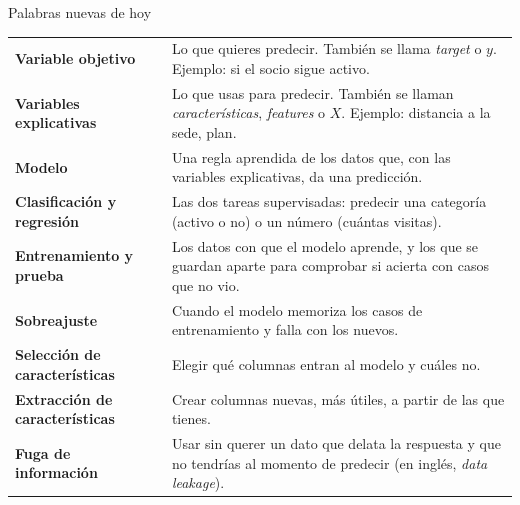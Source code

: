 \documentclass[aspectratio=169,11pt]{beamer}
\begin{document}
\begin{frame}[t]{Palabras nuevas de hoy}
  \footnotesize
  \renewcommand{\arraystretch}{1.1}
  \begin{tabular}{@{}L{3.6cm}L{9.9cm}@{}}
    \toprule
    \textbf{Variable objetivo} & Lo que quieres predecir. También se llama \textit{target} o $y$. Ejemplo: si el socio sigue activo. \\
    \textbf{Variables explicativas} & Lo que usas para predecir. También se llaman \textit{características}, \textit{features} o $X$. Ejemplo: distancia a la sede, plan. \\
    \textbf{Modelo} & Una regla aprendida de los datos que, con las variables explicativas, da una predicción. \\
    \textbf{Clasificación y regresión} & Las dos tareas supervisadas: predecir una categoría (activo o no) o un número (cuántas visitas). \\
    \textbf{Entrenamiento y prueba} & Los datos con que el modelo aprende, y los que se guardan aparte para comprobar si acierta con casos que no vio. \\
    \textbf{Sobreajuste} & Cuando el modelo memoriza los casos de entrenamiento y falla con los nuevos. \\
    \textbf{Selección de características} & Elegir qué columnas entran al modelo y cuáles no. \\
    \textbf{Extracción de características} & Crear columnas nuevas, más útiles, a partir de las que tienes. \\
    \textbf{Fuga de información} & Usar sin querer un dato que delata la respuesta y que no tendrías al momento de predecir (en inglés, \textit{data leakage}). \\
    \bottomrule
  \end{tabular}
\end{frame}

\end{document}
